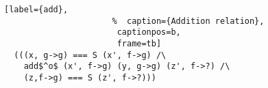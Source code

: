 \begin{figure}[!t]
  \centering
  \begin{minipage}{\columnwidth}
    \begin{lstlisting}[label={add},
                      %  caption={Addition relation},
                       captionpos=b,
                       frame=tb]
  (((x, g->g) === S (x', f->g) /\
    add$^o$ (x', f->g) (y, g->g) (z', f->?) /\
    (z,f->g) === S (z', f->?)))
    \end{lstlisting}
  \end{minipage}
\end{figure}